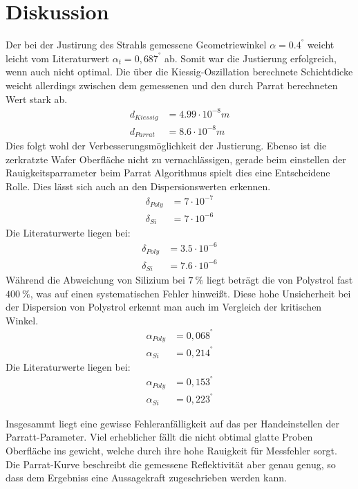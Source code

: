 \section{Diskussion}
\label{sec:Diskussion}

Der bei der Justirung des Strahls gemessene Geometriewinkel $\alpha = 0.4^°$ weicht leicht vom Literaturwert $\alpha_{t} = 0,687^°$ ab.
Somit war die Justierung erfolgreich, wenn auch nicht optimal.
Die über die Kiessig-Oszillation berechnete Schichtdicke weicht allerdings zwischen dem gemessenen 
und den durch Parrat berechneten Wert stark ab.
\begin{align*}
    d_{Kiessig} &= 4.99 \cdot 10^{-8} m \\
    d_{Parrat} &= 8.6 \cdot 10^{-8} m
\end{align*}
Dies folgt wohl der Verbesserungsmöglichkeit der Justierung.
Ebenso ist die zerkratzte Wafer Oberfläche nicht zu vernachlässigen,
gerade beim einstellen der Rauigkeitsparrameter beim Parrat Algorithmus spielt dies eine Entscheidene Rolle.
Dies lässt sich auch an den Dispersionswerten erkennen.
\begin{align*}
    \delta_{Poly} &= 7 \cdot 10^{-7}  \\
    \delta_{Si} &= 7 \cdot 10^{-6} 
\end{align*}
Die Literaturwerte \cite{wert} liegen bei:
\begin{align*}
    \delta_{Poly} &= 3.5 \cdot 10^{-6}  \\
    \delta_{Si} &= 7.6 \cdot 10^{-6} 
\end{align*}
Während die Abweichung von Silizium bei $\qty{7}{\percent}$ liegt beträgt die von Polystrol fast $\qty{400}{\percent}$,
was auf einen systematischen Fehler hinweißt.
Diese hohe Unsicherheit bei der Dispersion von Polystrol erkennt man auch im Vergleich der kritischen Winkel.
\begin{align*}
    \alpha_{Poly} &= 0,068^°  \\
    \alpha_{Si} &= 0,214^°
\end{align*}
Die Literaturwerte \cite{wert} liegen bei:
\begin{align*}
    \alpha_{Poly} &= 0,153^°  \\
    \alpha_{Si} &= 0,223^°
\end{align*}

Insgesammt liegt eine gewisse Fehleranfälligkeit auf das per Handeinstellen der Parratt-Parameter.
Viel erheblicher fällt die nicht obtimal glatte Proben Oberfläche ins gewicht,
welche durch ihre hohe Rauigkeit für Messfehler sorgt. 
Die Parrat-Kurve beschreibt die gemessene Reflektivität aber genau genug, 
so dass dem Ergebniss eine Aussagekraft zugeschrieben werden kann.